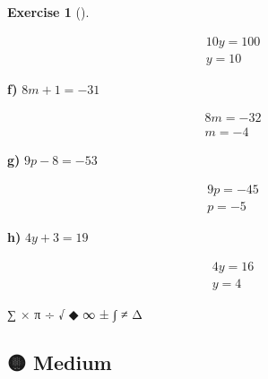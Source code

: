 \documentclass[
  letterpaper,
  DIV=11,
  numbers=noendperiod]{scrreprt}
\theoremstyle{definition}
\newtheorem{exercise}{Exercise}[chapter]
\theoremstyle{remark}
\begin{document}
\begin{exercise}[]
\begin{tcolorbox}
\begin{align*}
10y = 100 \\ y = 10
\end{align*}

\textbf{f)} \(\displaystyle 8m + 1 = -31\)

\begin{align*}
8m = -32 \\ m = -4
\end{align*}

\textbf{g)} \(\displaystyle 9p - 8 = -53\)

\begin{align*}
9p = -45 \\ p = -5
\end{align*}

\textbf{h)} \(\displaystyle 4y + 3 = 19\)

\begin{align*}
4y = 16 \\ y = 4
\end{align*}

\end{tcolorbox}

\end{exercise}

∑ × π ÷ √ ◆ ∞ ± ∫ ≠ Δ

\subsection{🟡 Medium}
\end{document}
